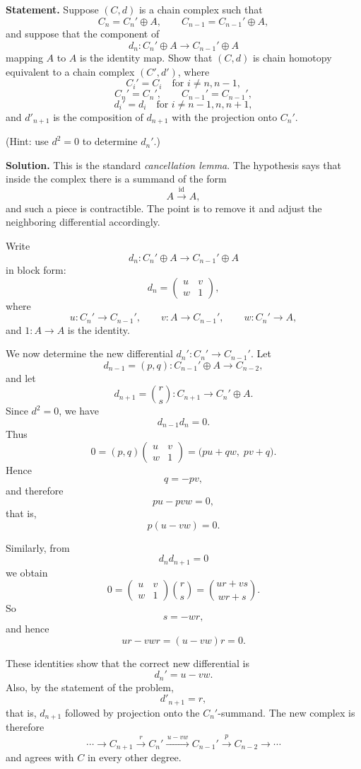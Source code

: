 \documentclass[12pt,a4paper]{article}
\theoremstyle{notespace}
\begin{document}
\textbf{Statement.}
Suppose \((C,d)\) is a chain complex such that
\[
C_n=C_n'\oplus A,\qquad C_{n-1}=C_{n-1}'\oplus A,
\]
and suppose that the component of
\[
d_n:C_n'\oplus A\longrightarrow C_{n-1}'\oplus A
\]
mapping \(A\) to \(A\) is the identity map. Show that \((C,d)\) is chain homotopy equivalent to a chain complex \((C',d')\), where
\[
C_i'=C_i \quad \text{for } i\neq n,n-1,
\]
\[
C_n'=C_n',\qquad C_{n-1}'=C_{n-1}',
\]
\[
d_i'=d_i \quad \text{for } i\neq n-1,n,n+1,
\]
and \(d'_{n+1}\) is the composition of \(d_{n+1}\) with the projection onto \(C_n'\).

(Hint: use \(d^2=0\) to determine \(d_n'\).)

\medskip

\textbf{Solution.}
This is the standard \emph{cancellation lemma}. The hypothesis says that inside the complex there is a summand of the form
\[
A \xrightarrow{\;\mathrm{id}\;} A,
\]
and such a piece is contractible. The point is to remove it and adjust the neighboring differential accordingly.

Write
\[
d_n:C_n'\oplus A\longrightarrow C_{n-1}'\oplus A
\]
in block form:
\[
d_n=
\begin{pmatrix}
	u & v\\
	w & 1
\end{pmatrix},
\]
where
\[
u:C_n'\to C_{n-1}',\qquad
v:A\to C_{n-1}',\qquad
w:C_n'\to A,
\]
and \(1:A\to A\) is the identity.

We now determine the new differential \(d_n':C_n'\to C_{n-1}'\). Let
\[
d_{n-1}=(p,q):C_{n-1}'\oplus A\to C_{n-2},
\]
and let
\[
d_{n+1}=\binom{r}{s}:C_{n+1}\to C_n'\oplus A.
\]
Since \(d^2=0\), we have
\[
d_{n-1}d_n=0.
\]
Thus
\[
0=(p,q)
\begin{pmatrix}
	u & v\\
	w & 1
\end{pmatrix}
=
\bigl(pu+qw,\;pv+q\bigr).
\]
Hence
\[
q=-pv,
\]
and therefore
\[
pu-pvw=0,
\]
that is,
\[
p(u-vw)=0.
\]

Similarly, from
\[
d_n d_{n+1}=0
\]
we obtain
\[
0=
\begin{pmatrix}
	u & v\\
	w & 1
\end{pmatrix}
\binom{r}{s}
=
\binom{ur+vs}{wr+s}.
\]
So
\[
s=-wr,
\]
and hence
\[
ur-vwr=(u-vw)r=0.
\]

These identities show that the correct new differential is
\[
d_n'=u-vw.
\]
Also, by the statement of the problem,
\[
d'_{n+1}=r,
\]
that is, \(d_{n+1}\) followed by projection onto the \(C_n'\)-summand. The new complex is therefore
\[
\cdots \to C_{n+1}\xrightarrow{\,r\,}C_n'\xrightarrow{\,u-vw\,}C_{n-1}'\xrightarrow{\,p\,}C_{n-2}\to\cdots
\]
and agrees with \(C\) in every other degree.
\end{document}
